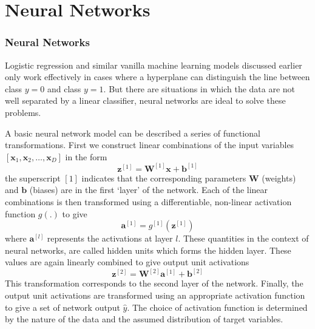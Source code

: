 \documentclass{beamer}
\begin{document}
\section{Neural Networks}
\begin{frame}[allowframebreaks]
\frametitle{Neural Networks}
Logistic regression and similar vanilla machine learning models discussed earlier only work effectively in cases where a hyperplane can distinguish the line between class $y=0$ and class $y=1$. But there are situations in which the data are not well separated by a linear classifier, neural networks are ideal to solve these problems.

A basic neural network model  can be described a series of functional transformations. First we construct linear combinations of the input variables $[\bm{x}_1,\bm{x}_2,\hdots,\bm{x}_D]$ in the form
\begin{equation}\label{z1}
\bm{z}^{[1]} = \bm{W}^{[1]}\bm{x} + \bm{b}^{[1]}
\end{equation}
the superscript $[1]$ indicates that the corresponding parameters $\bm{W}$ (weights) and $\bm{b}$ (biases) are in the first `layer' of the network. Each of the linear combinations is then transformed using a differentiable, non-linear activation function $g(.)$ to give
\begin{equation}\label{a1}
\bm{a}^{[1]} = g^{[1]}(\bm{z}^{[1]})
\end{equation}
where $\bm{a}^{[l]}$ represents the activations at layer $l$. These quantities in the context of neural networks, are called hidden units which forms the hidden layer. These values are again linearly combined to give output unit activations
\begin{equation}\label{z2}
\bm{z}^{[2]} = \bm{W}^{[2]}\bm{a}^{[1]} + \bm{b}^{[2]}
\end{equation}
This transformation corresponds to the second layer of the network. Finally, the output unit activations are transformed using an appropriate activation function to give a set of network output $\hat{y}$. The choice of activation function is determined by the nature of the data and the assumed distribution of target variables. 
\begin{figure}[H]
\def\layersep{3.5cm}
\tiny
\centering
\end{figure}
\end{frame}
\end{document}
